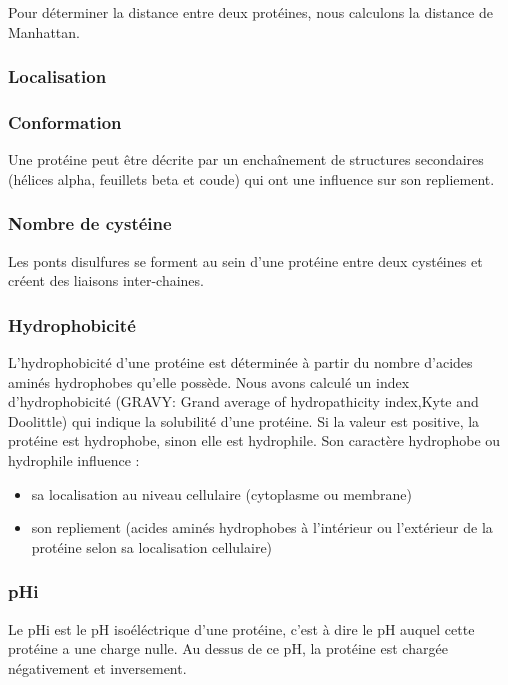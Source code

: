Pour déterminer la distance entre deux protéines, nous calculons la distance de Manhattan.



\subsubsection*{Localisation}

\subsubsection*{Conformation}
Une protéine peut être décrite par un enchaînement de structures secondaires (hélices alpha, feuillets beta et coude) qui ont une influence sur son repliement. 

\subsubsection*{Nombre de cystéine}
Les ponts disulfures se forment au sein d'une protéine entre deux cystéines et créent des liaisons inter-chaines. 


\subsubsection*{Hydrophobicité}
L'hydrophobicité d'une protéine est déterminée à partir du nombre d'acides aminés hydrophobes qu'elle possède.
Nous avons calculé un index d'hydrophobicité (GRAVY: Grand average of hydropathicity index,Kyte and Doolittle) qui indique la solubilité d'une protéine. Si la valeur est positive, la protéine est hydrophobe, sinon elle est hydrophile.
Son caractère hydrophobe ou hydrophile influence :
\begin{itemize}
\item sa localisation au niveau cellulaire (cytoplasme ou membrane)
\item son repliement (acides aminés hydrophobes à l'intérieur ou l'extérieur de la protéine selon sa localisation cellulaire) 
\end{itemize}

\subsubsection*{pHi}
Le pHi est le pH isoéléctrique d'une protéine, c'est à dire le pH auquel cette protéine a une charge nulle.
Au dessus de ce pH, la protéine est chargée négativement et inversement.

